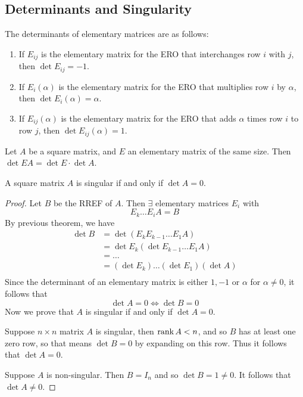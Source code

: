 \documentclass{article}
\begin{document}
\subsection{Determinants and Singularity}
\begin{theorem}
  The determinants of elementary matrices are as follows:
  \begin{enumerate}
    \item If $E_{ij}$ is the elementary matrix for the ERO that interchanges row $i$ with $j$, then $\det E_{ij} = -1$.
    \item If $E_i(\alpha)$ is the elementary matrix for the ERO that multiplies row $i$ by $\alpha$, then $\det E_i(\alpha) = \alpha$.
    \item If $E_{ij}(\alpha)$ is the elementary matrix for the ERO that adds $\alpha$ times row $i$ to row $j$, then $\det E_{ij}(\alpha) = 1$.
  \end{enumerate}
\end{theorem}
\begin{theorem}
  Let $A$ be a square matrix, and $E$ an elementary matrix of the same size. Then $\det EA = \det E \cdot \det A$.
\end{theorem}
\begin{theorem}
  A square matrix $A$ is singular if and only if $\det A = 0$.
\end{theorem}
\begin{proof}
  Let $B$ be the RREF of $A$. Then $\exists$ elementary matrices $E_i$ with \[
    E_k\dots E_iA = B
  \]
  By previous theorem, we have
  \begin{align*}
    \det B &= \det (E_kE_{k-1}\dots E_1A)\\
    &= \det E_k (\det E_{k-1}\dots E_1A)\\
    &= \dots\\
    &= (\det E_k)\dots(\det E_1)(\det A)\\
  \end{align*}
  Since the determinant of an elementary matrix is either $1, -1$ or $\alpha$ for $\alpha \neq 0$, it follows that \[
    \det A = 0 \iff \det B = 0
  \]
  Now we prove that $A$ is singular if and only if $\det A = 0$.

  Suppose $n \times n$ matrix $A$ is singular, then $\rank A < n$, and so $B$ has at least one zero row, so that means $\det B = 0$ by expanding on this row. Thus it follows that $\det A = 0$.

  Suppose $A$ is non-singular. Then $B = I_n$ and so $\det B = 1 \neq 0$. It follows that $\det A \neq 0$.
\end{proof}
\end{document}
